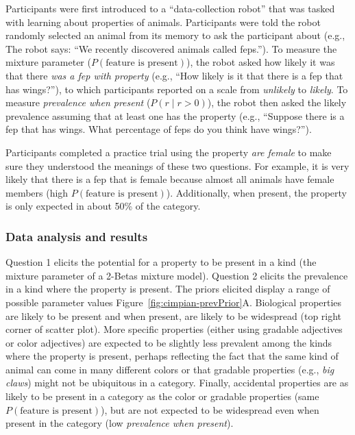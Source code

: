 \documentclass[floatsintext,doc]{apa6}
\theoremstyle{definition}
\theoremstyle{definition}
\theoremstyle{definition}
\theoremstyle{remark}
\begin{document}

Participants were first introduced to a \enquote{data-collection robot}
that was tasked with learning about properties of animals. Participants
were told the robot randomly selected an animal from its memory to ask
the participant about (e.g., The robot says: \enquote{We recently
discovered animals called feps.}). To measure the mixture parameter
(\(P(\text{feature is present})\)), the robot asked how likely it was
that there \emph{was a fep with property} (e.g., \enquote{How likely is
it that there is a fep that has wings?}), to which participants reported
on a scale from \emph{unlikely} to \emph{likely}. To measure
\emph{prevalence when present} (\(P(r \mid r > 0)\)), the robot then
asked the likely prevalence assuming that at least one has the property
(e.g., \enquote{Suppose there is a fep that has wings. What percentage
of feps do you think have wings?}).

Participants completed a practice trial using the property \emph{are
female} to make sure they understood the meanings of these two
questions. For example, it is very likely that there is a fep that is
female because almost all animals have female members (high
\(P(\text{feature is present})\)). Additionally, when present, the
property is only expected in about 50\% of the category.

\subsubsection{Data analysis and
results}\label{data-analysis-and-results}

Question 1 elicits the potential for a property to be present in a kind
(the mixture parameter of a 2-Betas mixture model). Question 2 elicits
the prevalence in a kind where the property is present. The priors
elicited display a range of possible parameter values
Figure~\ref{fig:cimpian-prevPrior}A. Biological properties are likely to
be present and when present, are likely to be widespread (top right
corner of scatter plot). More specific properties (either using gradable
adjectives or color adjectives) are expected to be slightly less
prevalent among the kinds where the property is present, perhaps
reflecting the fact that the same kind of animal can come in many
different colors or that gradable properties (e.g., \emph{big claws})
might not be ubiquitous in a category. Finally, accidental properties
are as likely to be present in a category as the color or gradable
properties (same \(P(\text{feature is present})\)), but are not expected
to be widespread even when present in the category (low \emph{prevalence
when present}).
\end{document}
